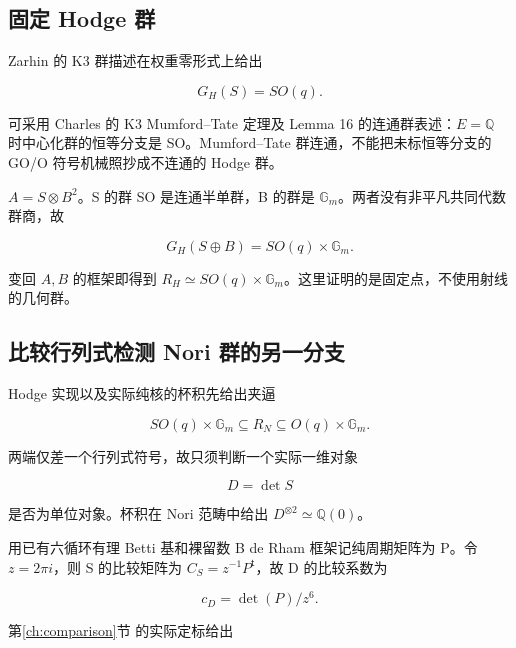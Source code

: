 \documentclass[11pt,a4paper,oneside]{ctexart}
\theoremstyle{cnplain}
\theoremstyle{definition}
\theoremstyle{remark}
\newcommand{\Gm}{\mathbb G_m}
\numberwithin{equation}{section}
\begin{document}
\subsection{固定 Hodge 群}\label{sec:fixed:5}

Zarhin 的 K3 群描述在权重零形式上给出

\begin{equation}
G_H(S)=SO(q).                           \label{eq:fixed:9}
\end{equation}

可采用 Charles 的 K3 Mumford--Tate 定理及 Lemma 16 的连通群表述：\(E=\)\(\mathbb Q\) 时中心化群的恒等分支是 SO。Mumford--Tate 群连通，不能把未标恒等分支的 GO/O 符号机械照抄成不连通的 Hodge 群。

\(A=S\otimes B^{2}\)。S 的群 SO 是连通半单群，B 的群是 \(\mathbb G_m\)。两者没有非平凡共同代数群商，故

\begin{equation}
G_H(S\oplus B)=SO(q)\times\mathbb G_m.
\end{equation}

变回 $A,B$ 的框架即得到 $R_H\simeq SO(q)\times\Gm$。这里证明的是固定点，不使用射线的几何群。


\subsection{比较行列式检测 Nori 群的另一分支}\label{sec:fixed:6}

Hodge 实现以及实际纯核的杯积先给出夹逼

\begin{equation}
SO(q)\times\mathbb G_m
   \subseteq R_N
   \subseteq O(q)\times\mathbb G_m.                               \label{eq:fixed:10}
\end{equation}

两端仅差一个行列式符号，故只须判断一个实际一维对象

\begin{equation}
D=\det S
\end{equation}

是否为单位对象。杯积在 Nori 范畴中给出 \(D^{\otimes2}\simeq\mathbb Q(0)\)。

用已有六循环有理 Betti 基和裸留数 B de Rham 框架记纯周期矩阵为 P。令 \(z=2\pi i\)，则 S 的比较矩阵为 \(C_S=z^{-1}P^{\mathsf t}\)，故 D 的比较系数为

\begin{equation}
c_D=\det(P)/z^6.
\end{equation}

第\ref{ch:comparison}节 的实际定标给出
\end{document}
